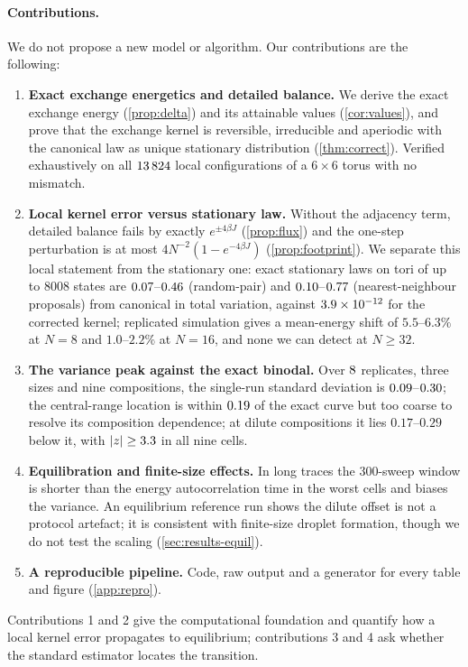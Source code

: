 \paragraph{Contributions.} We do not propose a new model or algorithm. Our contributions are the following:
\begin{enumerate}[leftmargin=2em]
\item \textbf{Exact exchange energetics and detailed balance.} We derive the exact exchange energy (\cref{prop:delta}) and its attainable values (\cref{cor:values}), and prove that the exchange kernel is reversible, irreducible and aperiodic with the canonical law as unique stationary distribution (\cref{thm:correct}). Verified exhaustively on all $13\,824$ local configurations of a $6\times6$ torus with no mismatch.
\item \textbf{Local kernel error versus stationary law.} Without the adjacency term, detailed balance fails by exactly $e^{\pm4\beta J}$ (\cref{prop:flux}) and the one-step perturbation is at most $4N^{-2}(1-e^{-4\beta J})$ (\cref{prop:footprint}). We separate this local statement from the stationary one: exact stationary laws on tori of up to $8008$ states are $0.07$--$0.46$ (random-pair) and $0.10$--$0.77$ (nearest-neighbour proposals) from canonical in total variation, against $3.9\times10^{-12}$ for the corrected kernel; replicated simulation gives a mean-energy shift of $5.5$--$6.3\%$ at $N=8$ and $1.0$--$2.2\%$ at $N=16$, and none we can detect at $N\ge32$.
\item \textbf{The variance peak against the exact binodal.} Over $8$ replicates, three sizes and nine compositions, the single-run standard deviation is $0.09$--$0.30$; the central-range location is within $0.19$ of the exact curve but too coarse to resolve its composition dependence; at dilute compositions it lies $0.17$--$0.29$ below it, with $|z|\ge3.3$ in all nine cells.
\item \textbf{Equilibration and finite-size effects.} In long traces the 300-sweep window is shorter than the energy autocorrelation time in the worst cells and biases the variance. An equilibrium reference run shows the dilute offset is not a protocol artefact; it is consistent with finite-size droplet formation, though we do not test the scaling (\cref{sec:results-equil}).
\item \textbf{A reproducible pipeline.} Code, raw output and a generator for every table and figure (\cref{app:repro}).
\end{enumerate}
Contributions 1 and 2 give the computational foundation and quantify how a local kernel error propagates to equilibrium; contributions 3 and 4 ask whether the standard estimator locates the transition.

